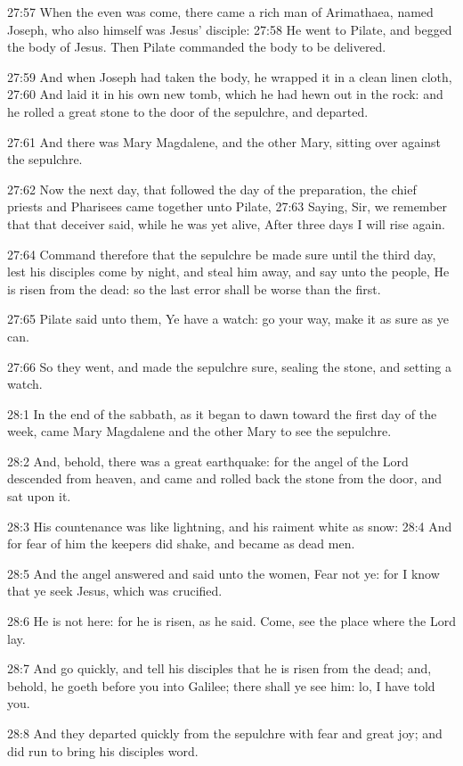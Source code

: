 27:57 When the even was come, there came a rich man of Arimathaea, named Joseph, who also himself was Jesus' disciple: 27:58 He went to Pilate, and begged the body of Jesus. Then Pilate commanded the body to be delivered.

27:59 And when Joseph had taken the body, he wrapped it in a clean linen cloth, 27:60 And laid it in his own new tomb, which he had hewn out in the rock: and he rolled a great stone to the door of the sepulchre, and departed.

27:61 And there was Mary Magdalene, and the other Mary, sitting over against the sepulchre.

27:62 Now the next day, that followed the day of the preparation, the chief priests and Pharisees came together unto Pilate, 27:63 Saying, Sir, we remember that that deceiver said, while he was yet alive, After three days I will rise again.

27:64 Command therefore that the sepulchre be made sure until the third day, lest his disciples come by night, and steal him away, and say unto the people, He is risen from the dead: so the last error shall be worse than the first.

27:65 Pilate said unto them, Ye have a watch: go your way, make it as sure as ye can.

27:66 So they went, and made the sepulchre sure, sealing the stone, and setting a watch.

28:1 In the end of the sabbath, as it began to dawn toward the first day of the week, came Mary Magdalene and the other Mary to see the sepulchre.

28:2 And, behold, there was a great earthquake: for the angel of the Lord descended from heaven, and came and rolled back the stone from the door, and sat upon it.

28:3 His countenance was like lightning, and his raiment white as snow: 28:4 And for fear of him the keepers did shake, and became as dead men.

28:5 And the angel answered and said unto the women, Fear not ye: for I know that ye seek Jesus, which was crucified.

28:6 He is not here: for he is risen, as he said. Come, see the place where the Lord lay.

28:7 And go quickly, and tell his disciples that he is risen from the dead; and, behold, he goeth before you into Galilee; there shall ye see him: lo, I have told you.

28:8 And they departed quickly from the sepulchre with fear and great joy; and did run to bring his disciples word.

